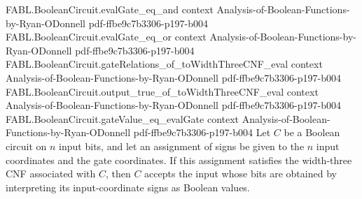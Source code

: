 \begin{theorem}
\proofstep
  {FABL.BooleanCircuit.evalGate_eq_and}
  {context}
  {Analysis-of-Boolean-Functions-by-Ryan-ODonnell}
  {pdf-ffbe9c7b3306-p197-b004}
\proofstep
  {FABL.BooleanCircuit.evalGate_eq_or}
  {context}
  {Analysis-of-Boolean-Functions-by-Ryan-ODonnell}
  {pdf-ffbe9c7b3306-p197-b004}
\proofstep
  {FABL.BooleanCircuit.gateRelations_of_toWidthThreeCNF_eval}
  {context}
  {Analysis-of-Boolean-Functions-by-Ryan-ODonnell}
  {pdf-ffbe9c7b3306-p197-b004}
\proofstep
  {FABL.BooleanCircuit.output_true_of_toWidthThreeCNF_eval}
  {context}
  {Analysis-of-Boolean-Functions-by-Ryan-ODonnell}
  {pdf-ffbe9c7b3306-p197-b004}
\proofstep
  {FABL.BooleanCircuit.gateValue_eq_evalGate}
  {context}
  {Analysis-of-Boolean-Functions-by-Ryan-ODonnell}
  {pdf-ffbe9c7b3306-p197-b004}
Let $C$ be a Boolean circuit on $n$ input bits, and let an assignment of signs be given
to the $n$ input coordinates and the gate coordinates. If this assignment satisfies the
width-three CNF associated with $C$, then $C$ accepts the input whose bits are obtained
by interpreting its input-coordinate signs as Boolean values.
\end{theorem}

